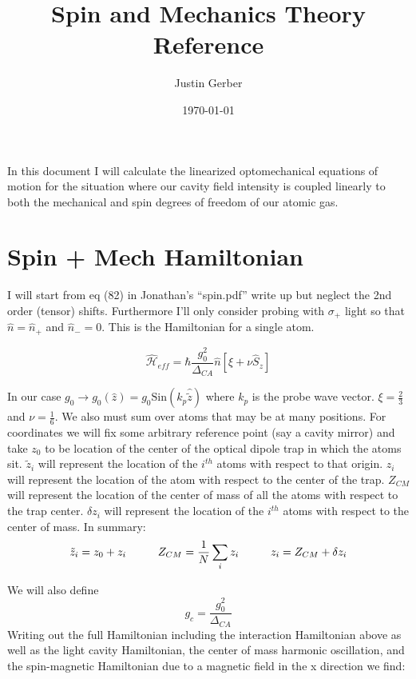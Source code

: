 \documentclass[12pt]{article}
\begin{document}
\title{Spin and Mechanics Theory Reference}
\author{Justin Gerber}
\date{\today}
\maketitle

In this document I will calculate the linearized optomechanical equations of motion for the situation where our cavity field intensity is coupled linearly to both the mechanical and spin degrees of freedom of our atomic gas.

\section{Spin + Mech Hamiltonian}
I will start from eq (82) in Jonathan's ``spin.pdf'' write up but neglect the 2nd order (tensor) shifts. Furthermore I'll only consider probing with $\sigma_+$ light so that $\hat{n} = \hat{n}_+$ and $\hat{n}_- = 0$. This is the Hamiltonian for a single atom.

\begin{equation}
\widehat{\mathcal{H}}_{eff} = \hbar \frac{g_0^2}{\Delta_{CA}} 
\hat{n} \left[ \xi + \nu \hat{S}_z \right]
\end{equation}

In our case $g_0 \rightarrow g_0(\hat{z}) = g_0 \text{Sin}(k_p \hat{\tilde{z}})$ where $k_p$ is the probe wave vector. $\xi = \frac{2}{3}$ and $\nu = \frac{1}{6}$. We also must sum over atoms that may be at many positions. For coordinates we will fix some arbitrary reference point (say a cavity mirror) and take $z_0$ to be location of the center of the optical dipole trap in which the atoms sit. $\tilde{z}_i$ will represent the location of the $i^{th}$ atoms with respect to that origin. $z_i$ will represent the location of the atom with respect to the center of the trap. $Z_{CM}$ will represent the location of the center of mass of all the atoms with respect to the trap center. $\delta z_i$ will represent the location of the $i^{th}$ atoms with respect to the center of mass. In summary:
\[ \tilde{z}_i = z_0 + z_i \hspace{1 cm} Z_{CM} = \frac{1}{N} \sum_i z_i \hspace{1 cm} z_i = Z_{CM} + \delta z_i\]

We will also define
\[ g_c = \frac{g_0^2}{\Delta_{CA}} \]
Writing out the full Hamiltonian including the interaction Hamiltonian above as well as the light cavity Hamiltonian, the center of mass harmonic oscillation, and the spin-magnetic Hamiltonian due to a magnetic field in the x direction we find:
\end{document}
